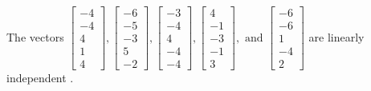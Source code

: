 \begin{exercise}
\begin{exerciseStatement}
  \end{exerciseStatement}
  \begin{exerciseAnswer}
   The vectors \(\left[\begin{array}{r}
-4 \\
-4 \\
4 \\
1 \\
4
\end{array}\right] , \left[\begin{array}{r}
-6 \\
-5 \\
-3 \\
5 \\
-2
\end{array}\right] , \left[\begin{array}{r}
-3 \\
-4 \\
4 \\
-4 \\
-4
\end{array}\right] , \left[\begin{array}{r}
4 \\
-1 \\
-3 \\
-1 \\
3
\end{array}\right] , \text{ and } \left[\begin{array}{r}
-6 \\
-6 \\
1 \\
-4 \\
2
\end{array}\right]\) are 
  	 linearly independent  .
  


  \end{exerciseAnswer}
\end{exercise}